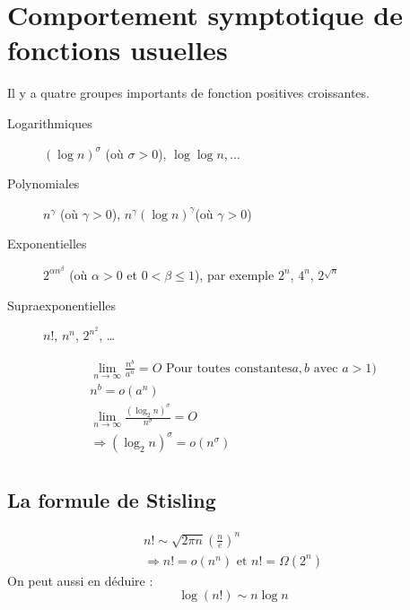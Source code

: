 	\section{Comportement symptotique de fonctions usuelles}
	Il y a quatre groupes importants de fonction positives croissantes.
	\begin{description}
		\item[Logarithmiques] $(\log n)^\sigma$ (où $\sigma > 0$), $\log\log n, \ldots$
		\item[Polynomiales] $n^\gamma$ (où $\gamma > 0$), $n^\gamma(\log n)^\gamma$(où $\gamma > 0$)
		\item[Exponentielles] $2^{\alpha n^\beta}$ (où $\alpha > 0$ et $0 < \beta \leq 1$), par exemple $2^n$, $4^n$, $2^{\sqrt{n}}$
		\item[Supraexponentielles] $n!$, $n^n$, $2^{n^2}$, \ldots
	\end{description}

	\begin{eqnarray*}
		\lim_{n\rightarrow \infty} \frac{n^b}{a^n} = O \textrm{ Pour toutes constantes} a,b \textrm{ avec } a > 1 \textrm{)}\\
		n^b = o(a^n)\\
		\lim_{n\rightarrow \infty} \frac{(\log_2 n)^{\sigma}}{n^\sigma} = O\\
		\Rightarrow (\log_2 n)^\sigma = o(n^\sigma)\\
	\end{eqnarray*}


	\subsection{La formule de Stisling}
	\begin{eqnarray*}
		n! \sim \sqrt{2\pi n}(\frac{n}{e})^n\\
		\Rightarrow n! = o(n^n) \textrm{ et } n! = \Omega(2^n)
	\end{eqnarray*}
	On peut aussi en déduire :
	$$\log(n!) \sim n\log n$$

